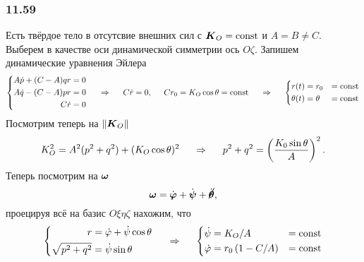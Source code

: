 \subsubsection*{11.59}

Есть твёрдое тело в отсутсвие внешних сил с $\mbox{\boldmath $K$}_O = \text{const}$ и $A = B \neq C$. Выберем в качестве оси динамической симметрии ось $O\zeta$. Запишем динамические уравнения Эйлера
\begin{equation*}
    \left\{\begin{aligned}
        A \dot{p} + (C-A) qr &= 0 \\
        A \dot{q} - (C-A) pr &= 0 \\
        C \dot{r} &= 0
    \end{aligned}\right.
    \hspace{0.5cm} \Rightarrow \hspace{0.5cm} 
    C \dot{r} = 0, \hspace{0.5cm} Cr_0 = K_O \cos \theta = \text{const}
    \hspace{0.5cm} \Rightarrow \hspace{0.5cm} 
    \left\{\begin{aligned}
        r(t) &= r_0 &= \text{const}\\
        \theta(t) &= \theta &= \text{const}
    \end{aligned}\right.
\end{equation*}
Посмотрим теперь на $\|\mbox{\boldmath $K$}_O\|$
\begin{equation*}
    K_O^2 = A^2 (p^2 + q^2) + (K_O \cos \theta)^2
    \hspace{0.5cm} \Rightarrow \hspace{0.5cm} 
    p^2 + q^2 = \left(\frac{K_0 \sin \theta}{A} \right)^2.
\end{equation*}
Теперь посмотрим на $\mbox{\boldmath $\omega$}$
\begin{equation*}
    \mbox{\boldmath $\omega$} = \dot{\mbox{\boldmath $\varphi$}} + \dot{\mbox{\boldmath $\psi$}} + \cancel{\dot{\mbox{\boldmath $\theta$}}},
\end{equation*}
проецируя всё на базис $O\xi\eta\zeta$ нахожим, что
\begin{equation*}
    \left\{\begin{aligned}
        r &= \dot{\varphi} + \dot{\psi} \cos \theta \\
        \sqrt{p^2 + q^2} &= \dot{\psi} \sin \theta       
    \end{aligned}\right.
    \hspace{0.5cm} \Rightarrow \hspace{0.5cm} 
   \left\{\begin{aligned}
       \dot{\psi} &= {K_O}/{A} &= \text{const} \\
       \dot{\varphi} &= r_0 \left(1 - {C}/{A} \right) &=\text{const}
   \end{aligned}\right.
\end{equation*}
